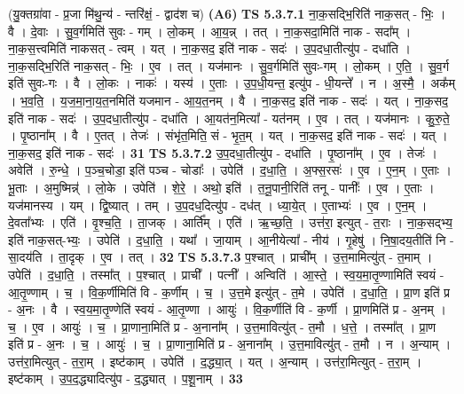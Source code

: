 \documentclass[17pt]{extarticle}
\begin{document}
                  \newline
                      (यु॒क्तग्रा॑वा - प्र॒जा मि॑थु॒न्य॑ - न्तरि॑क्षं॒ - द्वाद॑श च)  \textbf{(A6)} \newline \newline
                                \textbf{ TS 5.3.7.1} \newline
                  ना॒क॒सद्भि॒रिति॑ नाक॒सत् - भिः॒ । वै । दे॒वाः । सु॒व॒र्गमिति॑ सुवः - गम् । लो॒कम् । आ॒य॒न्न् । तत् । ना॒क॒सदा॒मिति॑ नाक - सदा᳚म् । ना॒क॒स॒त्त्वमिति॑ नाकसत् - त्वम् । यत् । ना॒क॒सद॒ इति॑ नाक - सदः॑ । उ॒प॒दधा॒तीत्यु॑प - दधा॑ति । ना॒क॒सद्भि॒रिति॑ नाक॒सत् - भिः॒ । ए॒व । तत् । यज॑मानः । सु॒व॒र्गमिति॑ सुवः-गम् । लो॒कम् । ए॒ति॒ । सु॒व॒र्ग इति॑ सुवः-गः । वै । लो॒कः । नाकः॑ । यस्य॑ । ए॒ताः । उ॒प॒धी॒यन्त॒ इत्यु॑प - धी॒यन्ते᳚ । न । अ॒स्मै॒ । अक᳚म् । भ॒व॒ति॒ । य॒ज॒मा॒ना॒य॒त॒नमिति॑ यजमान - आ॒य॒त॒नम् । वै । ना॒क॒सद॒ इति॑ नाक - सदः॑ । यत् । ना॒क॒सद॒ इति॑ नाक - सदः॑ । उ॒प॒दधा॒तीत्यु॑प - दधा॑ति । आ॒यत॑न॒मित्या᳚ - यत॑नम् । ए॒व । तत् । यज॑मानः । कु॒रु॒ते॒ । पृ॒ष्ठाना᳚म् । वै । ए॒तत् । तेजः॑ । संभृ॑त॒मिति॒ सं - भृ॒त॒म् । यत् । ना॒क॒सद॒ इति॑ नाक - सदः॑ । यत् । ना॒क॒सद॒ इति॑ नाक - सदः॑ । \textbf{  31} \newline
                  \newline
                                \textbf{ TS 5.3.7.2} \newline
                  उ॒प॒दधा॒तीत्यु॑प - दधा॑ति । पृ॒ष्ठाना᳚म् । ए॒व । तेजः॑ । अवेति॑ । रु॒न्धे॒ । प॒ञ्च॒चोडा॒ इति॑ पञ्च - चोडाः᳚ । उपेति॑ । द॒धा॒ति॒ । अ॒फ्स॒रसः॑ । ए॒व । ए॒न॒म् । ए॒ताः । भू॒ताः । अ॒मुष्मिन्न्॑ । लो॒के । उपेति॑ । शे॒रे॒ । अथो॒ इति॑ । त॒नू॒पानी॒रिति॑ तनू - पानीः᳚ । ए॒व । ए॒ताः । यज॑मानस्य । यम् । द्वि॒ष्यात् । तम् । उ॒प॒दध॒दित्यु॑प - दध॑त् । ध्या॒ये॒त् । ए॒ताभ्यः॑ । ए॒व । ए॒न॒म् । दे॒वता᳚भ्यः । एति॑ । वृ॒श्च॒ति॒ । ता॒जक् । आर्ति᳚म् । एति॑ । ऋ॒च्छ॒ति॒ । उत्त॑रा॒ इत्युत् - त॒राः । ना॒क॒सद्भ्य॒ इति॑ नाक॒सत्-भ्यः॒ । उपेति॑ । द॒धा॒ति॒ । यथा᳚ । जा॒याम् । आ॒नीयेत्या᳚ - नीय॑ । गृ॒हेषु॑ । नि॒षा॒दय॒तीति॑ नि - सा॒दय॑ति । ता॒दृक् । ए॒व । तत् । \textbf{  32} \newline
                  \newline
                                \textbf{ TS 5.3.7.3} \newline
                  प॒श्चात् । प्राची᳚म् । उ॒त्त॒मामित्यु॑त् - त॒माम् । उपेति॑ । द॒धा॒ति॒ । तस्मा᳚त् । प॒श्चात् । प्राची᳚ । पत्नी᳚ । अन्विति॑ । आ॒स्ते॒ । स्व॒य॒मा॒तृ॒ण्णामिति॑ स्वयं - आ॒तृ॒ण्णाम् । च॒ । वि॒क॒र्णीमिति॑ वि - क॒र्णीम् । च॒ । उ॒त्त॒मे इत्यु॑त् - त॒मे । उपेति॑ । द॒धा॒ति॒ । प्रा॒ण इति॑ प्र - अ॒नः । वै । स्व॒य॒मा॒तृ॒ण्णेति॑ स्वयं - आ॒तृ॒ण्णा । आयुः॑ । वि॒क॒र्णीति॑ वि - क॒र्णी । प्रा॒णमिति॑ प्र - अ॒नम् । च॒ । ए॒व । आयुः॑ । च॒ । प्रा॒णाना॒मिति॑ प्र - अ॒नाना᳚म् । उ॒त्त॒मावित्यु॑त् - त॒मौ । ध॒त्ते॒ । तस्मा᳚त् । प्रा॒ण इति॑ प्र - अ॒नः । च॒ । आयुः॑ । च॒ । प्रा॒णाना॒मिति॑ प्र - अ॒नाना᳚म् । उ॒त्त॒मावित्यु॑त् - त॒मौ । न । अ॒न्याम् । उत्त॑रा॒मित्युत् - त॒रा॒म् । इष्ट॑काम् । उपेति॑ । द॒द्ध्या॒त् । यत् । अ॒न्याम् । उत्त॑रा॒मित्युत् - त॒रा॒म् । इष्ट॑काम् । उ॒प॒द॒द्ध्यादित्यु॑प - द॒द्ध्यात् । प॒शू॒नाम् । \textbf{  33} \newline
\end{document}
